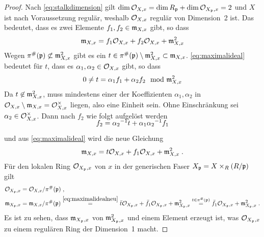 \begin{Lemma}
\begin{proof}
    Nach \autoref{eq:stalkdimension} gilt
    ${\dim\mathcal{O}_{X,x}=\dim R_{\mathfrak{p}}+\dim\mathcal{O}_{X_{\mathfrak{p}},x}=2}$ und $X$ ist nach
    Voraussetzung regulär, weshalb $\mathcal{O}_{X,x}$ regulär von Dimension~2
    ist. Das bedeutet, dass es zwei Elemente $f_1, {f_2\in\mathfrak{m}_{X,x}}$
    gibt, so dass
    \begin{gather}\label{eq:maximalideal}
      \mathfrak{m}_{X,x} = f_1\mathcal{O}_{X,x} + f_2\mathcal{O}_{X,x} + \mathfrak{m}_{X,x}^2
    \end{gather}
    Wegen ${\pi^\#(\mathfrak{p})\not\subset\mathfrak{m}_{X,x}^2}$ gibt es ein
    ${t\in\pi^\#(\mathfrak{p})\setminus\mathfrak{m}_{X,x}^2\subset\mathfrak{m}_{X,x}}$.
    \autoref{eq:maximalideal} bedeutet für $t$, dass es $\alpha_1,
    {\alpha_2\in\mathcal{O}_{X,x}}$ gibt, so dass
    \begin{gather*}
      0 \neq t = \alpha_1 f_1 + \alpha_2 f_2 \mod {\mathfrak{m}}_{X,x}^2
    \end{gather*}
    Da $t\not\in\mathfrak{m}_{X,x}^2$, muss mindestens einer der Koeffizienten
    $\alpha_1,\alpha_2$ in $\mathcal{O}_{X,x}\setminus\mathfrak{m}_{X,x}=\mathcal{O}_{X,x}^\times$
    liegen, also eine Einheit sein. Ohne Einschränkung sei
    $\alpha_2\in\mathcal{O}_{X,x}^\times$. Dann nach $f_2$ wie folgt
    aufgelöst werden
    \begin{gather*}
      \SwapAboveDisplaySkip
      f_2 = {\alpha_2}^{-1}t + {\alpha_1}{\alpha_2}^{-1}f_1 
    \end{gather*}
    und aus \eqref{eq:maximalideal} wird die neue Gleichung
    \begin{gather}\label{eq:maximalidealneu}
      \mathfrak{m}_{X,x} = t\mathcal{O}_{X,x} + f_1\mathcal{O}_{X,x} + \mathfrak{m}_{X,x}^2\;.
    \end{gather}
    Für den lokalen Ring $\mathcal{O}_{X_{\mathfrak{p}},x}$ von $x$ in der generischen
    Faser ${X_{\mathfrak{p}} = X\times_R (R/\mathfrak{p})}$ gilt
    \begin{align*}
      \mathcal{O}_{X_{\mathfrak{p}},x} &= \mathcal{O}_{X,x}/\pi^\#(\mathfrak{p})\;,\\
      \mathfrak{m}_{X_{\mathfrak{p}},x} &= \mathfrak{m}_{X,x}/\pi^\#(\mathfrak{p})
                    \overset{\eqref{eq:maximalidealneu}}{=}
                    \bar t\mathcal{O}_{X_{\mathfrak{p}},x} + \bar f_1\mathcal{O}_{X_{\mathfrak{p}},x} +
                    \mathfrak{m}_{X_{\mathfrak{p}},x}^2
                    \overset{t\in\pi^\#(\mathfrak{p})}{=}
                    \bar f_1\mathcal{O}_{X_{\mathfrak{p}},x} + \mathfrak{m}_{X_{\mathfrak{p}},x}^2 \;.
    \end{align*}
    Es ist zu sehen, dass $\mathfrak{m}_{X_{\mathfrak{p}},x}$ von $\mathfrak{m}_{X_{\mathfrak{p}},x}^2$ und einem Element
    erzeugt ist, was $\mathcal{O}_{X_{\mathfrak{p}},x}$ zu einem regulären Ring der Dimension~1
    macht.
  \end{proof}
\end{Lemma}

